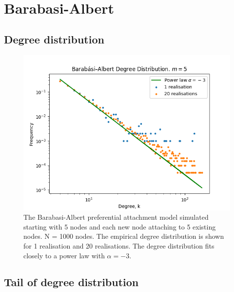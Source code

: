 \documentclass{article}
\begin{document}
\section{Barabasi-Albert}


\subsection{Degree distribution}

\begin{figure}[H]
\includegraphics[scale=0.8]{barabasi_deg_dist_a.png} 
\caption{The Barabasi-Albert preferential attachment model simulated starting with 5 nodes and each new node attaching to 5 existing nodes. N = 1000 nodes. The empirical degree distribution is shown for 1 realisation and 20 realisations. The degree distribution fits closely to a power law with $\alpha=-3$.} 
\label{fig:barabasi}
\end{figure}


\subsection{Tail of degree distribution}
\end{document}

